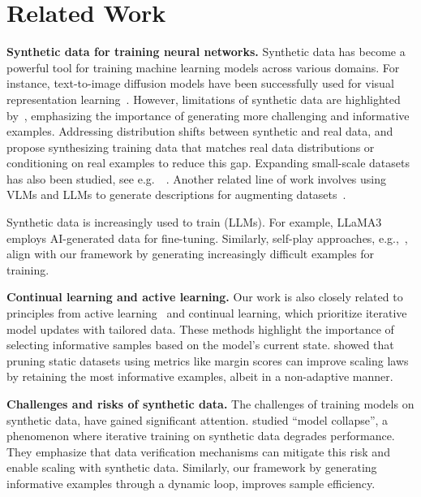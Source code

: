 \section{Related Work}
\textbf{Synthetic data for training neural networks.} Synthetic data has become a powerful tool for training machine learning models across various domains. For instance, text-to-image diffusion models have been successfully used for visual representation learning~\citep{astolfi2023instance, li2025genview, tian2024learning, tian2024stablerep, sariyildiz2023fake}. However,  limitations of synthetic data are highlighted by~\citet{fan2024scaling}, emphasizing the importance of generating more challenging and informative examples. Addressing distribution shifts between synthetic and real data, \citet{hemmat2023feedback} and \citet{yuan2023real} propose synthesizing training data that matches real data distributions or conditioning on real examples to reduce this gap. Expanding small-scale datasets has also been studied, see e.g.\ ~\citet{zhang2024expanding}.
Another related line of work involves using VLMs and LLMs to generate descriptions for augmenting datasets~\citep{dunlap2023diversify}.

Synthetic data is increasingly used to train (LLMs). For example, LLaMA3~\citep{grattafiori2024llama3herdmodels} employs AI-generated data for fine-tuning. Similarly, self-play approaches, e.g.,\ \citet{yuan2024self}, align with our framework by generating increasingly difficult examples for training.

\textbf{Continual learning and active learning.}
 Our work is also closely related to principles from active learning~\citep{bang2024active,evans2023bad} and continual learning, which prioritize iterative model updates with tailored data. These methods highlight the importance of selecting informative samples based on the model's current state.
 \cite{sorscher2022beyond} showed that pruning static datasets using metrics like margin scores can improve scaling laws by retaining the most informative examples, albeit in a non-adaptive manner.
 
\textbf{Challenges and risks of synthetic data.}
The challenges of training models on synthetic data, have gained significant attention. \citet{dohmatob2024strong,dohmatob2024tale} studied “model collapse”, a phenomenon where iterative training on synthetic data degrades performance. 
They emphasize that data verification mechanisms can mitigate this risk and enable scaling with synthetic data. Similarly, our framework by generating informative examples through a dynamic loop, improves sample efficiency.


